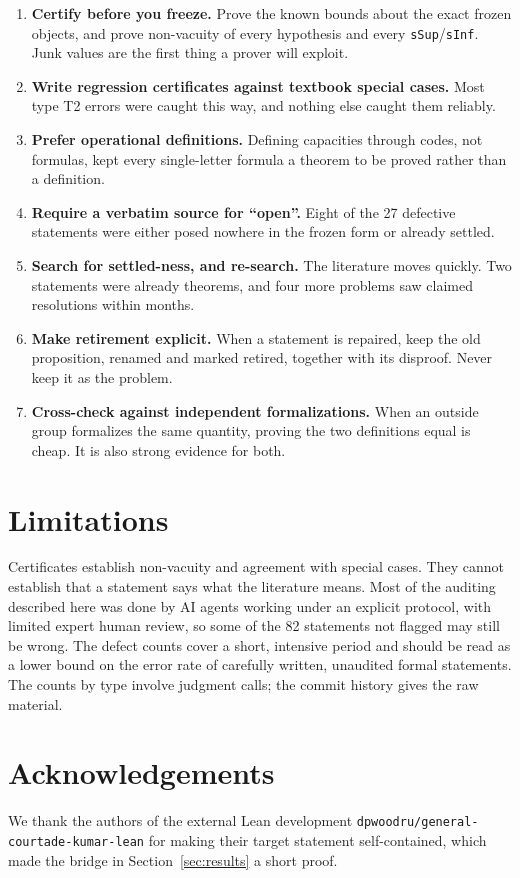 \documentclass[11pt]{article}
\newcommand{\code}[1]{\texttt{#1}}
\begin{document}
\begin{enumerate}[leftmargin=*,itemsep=3pt]
\item \textbf{Certify before you freeze.} Prove the known bounds about the exact frozen objects,
and prove non-vacuity of every hypothesis and every \code{sSup}/\code{sInf}. Junk values are the
first thing a prover will exploit.
\item \textbf{Write regression certificates against textbook special cases.} Most type T2 errors
were caught this way, and nothing else caught them reliably.
\item \textbf{Prefer operational definitions.} Defining capacities through codes, not formulas,
kept every single-letter formula a theorem to be proved rather than a definition.
\item \textbf{Require a verbatim source for ``open''.} Eight of the 27 defective statements
were either posed nowhere in the frozen form or already settled.
\item \textbf{Search for settled-ness, and re-search.} The literature moves quickly. Two
statements were already theorems, and four more problems saw claimed resolutions within months.
\item \textbf{Make retirement explicit.} When a statement is repaired, keep the old proposition,
renamed and marked retired, together with its disproof. Never keep it as the problem.
\item \textbf{Cross-check against independent formalizations.} When an outside group formalizes
the same quantity, proving the two definitions equal is cheap. It is also strong evidence for both.
\end{enumerate}

\section{Limitations}

Certificates establish non-vacuity and agreement with special cases. They cannot establish that a
statement says what the literature means. Most of the auditing described here was done by AI
agents working under an explicit protocol, with limited expert human review, so some of the 82
statements not flagged may still be wrong. The defect counts cover a short, intensive period and
should be read as a lower bound on the error rate of carefully written, unaudited formal
statements. The counts by type involve judgment calls; the commit history gives the raw material.

\section*{Acknowledgements}
We thank the authors of the external Lean development \code{dpwoodru/general-courtade-kumar-lean}
for making their target statement self-contained, which made the bridge in
Section~\ref{sec:results} a short proof.
\end{document}
